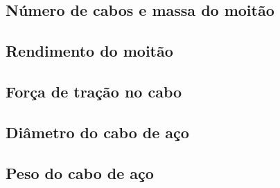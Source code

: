\subsection{Número de cabos e massa do moitão}


\subsection{Rendimento do moitão}


\subsection{Força de tração no cabo}
\label{sec:forca_de_tracao_no_cabo}


\subsection{Diâmetro do cabo de aço}


\subsection{Peso do cabo de aço}
\label{sec:peso_do_cabo_de_aco}

